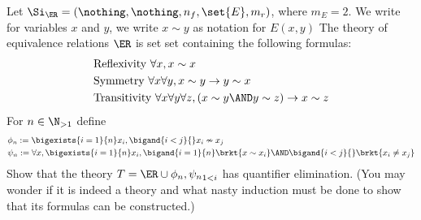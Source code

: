 \begin{ex}
    Let $\Si_{\ER} = (\nothing,\nothing,n_f,\set{E},m_r)$,
    where $m_E = 2$.
    We write for variables $x$ and $y$, 
    we write $x \sim y$ as notation for $E(x,y)$
    The theory of equivalence relations $\ER$ 
    is set set containing the following formulas:
    \begin{align*}
        &\text{Reflexivity } \forall x, x \sim x\\
        &\text{Symmetry } \forall x \forall y, x \sim y \to y \sim x\\
        &\text{Transitivity } 
        \forall x \forall y \forall z, (x \sim y \AND y \sim z) \to x \sim z
    \end{align*}
    For $n \in \N_{>1}$ define 
    \begin{align*}
        &\phi_n := \bigexists{i = 1}{n} x_i, \bigand{i < j}{} x_i \nsim x_j\\
        &\psi_n := \forall x, \bigexists{i = 1}{n} x_i, 
            \bigand{i = 1}{n} \brkt{x \sim x_i} \AND 
            \bigand{i < j}{} \brkt{x_i \ne x_j}
    \end{align*}
    Show that the theory $T = \ER \cup {\phi_n, \psi_n}_{1 < i}$ has 
    quantifier elimination.
    (You may wonder if it is indeed a theory
    and what nasty induction must be done to 
    show that its formulas can be constructed.)
\end{ex}
